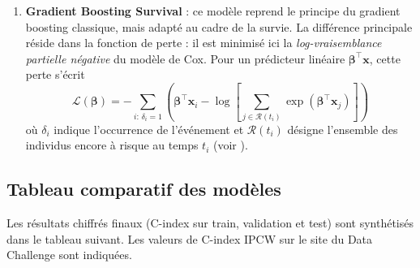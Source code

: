 \documentclass[12pt,a4paper]{article}
\begin{document}
\begin{enumerate}
\paragraph{Agrégation des arbres.}
Pour un individu de covariables $\mathbf{x}$, chaque arbre fournit une estimation de la fonction de risque cumulé correspondant à la feuille dans laquelle l’individu est projeté. La forêt agrège ces estimations par moyenne sur l’ensemble des arbres :
\begin{equation}
\hat H(t \mid \mathbf{x}) = \frac{1}{B} \sum_{b=1}^{B} \hat H_{h_b(\mathbf{x})}(t)
\end{equation}
où $h_b(\mathbf{x})$ désigne la feuille de l’arbre $b$ contenant l’individu $\mathbf{x}$.
  \item \textbf{Gradient Boosting Survival} :
ce modèle reprend le principe du gradient boosting classique, mais adapté au cadre de la survie. La différence principale réside dans la fonction de perte : il est minimisé ici la \emph{log-vraisemblance partielle négative} du modèle de Cox. Pour un prédicteur linéaire $\boldsymbol{\beta}^\top \mathbf{x}$, cette perte s’écrit
\begin{equation}
\mathcal{L}(\boldsymbol{\beta}) = -\sum_{i:\,\delta_i = 1} \left( \boldsymbol{\beta}^\top \mathbf{x}_i - \log\!\left[ \sum_{j \in \mathcal{R}(t_i)} \exp(\boldsymbol{\beta}^\top \mathbf{x}_j) \right] \right)
\end{equation}
où $\delta_i$ indique l’occurrence de l’événement et $\mathcal{R}(t_i)$ désigne l’ensemble des individus encore à risque au temps $t_i$ (voir \cite{scikit-gbsurv}).
\end{enumerate}
\subsection{Tableau comparatif des modèles}
Les résultats chiffrés finaux (C-index sur train, validation et test) sont synthétisés dans le tableau suivant. Les valeurs de C-index IPCW sur le site du Data Challenge sont indiquées.
\end{document}
